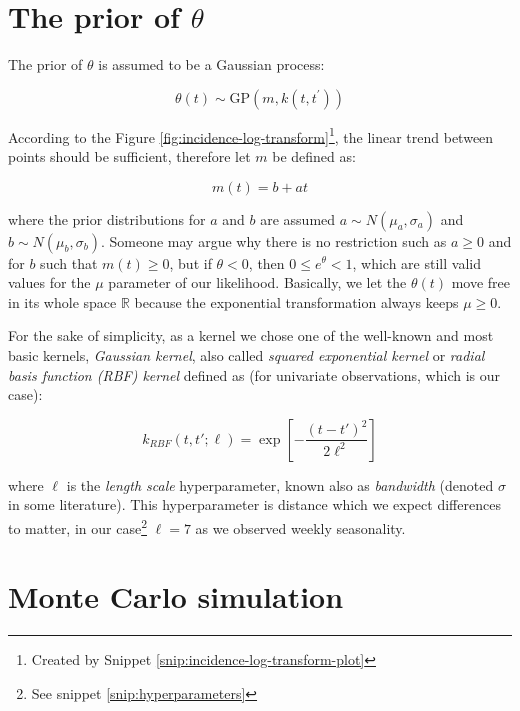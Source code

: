 \documentclass[
  digital, %
  oneside, %
  lof,     %
  lot,     %
]{fithesis4}
\begin{document}
\section{The prior of \texorpdfstring{$\theta$}{Lg}}

The prior of $\theta$ is assumed to be a Gaussian process:

\begin{equation}
  \theta(t) \sim \text{GP}(m, k(t, t^\prime))
\end{equation}

According to the Figure \ref{fig:incidence-log-transform}\footnote{Created by Snippet \ref{snip:incidence-log-transform-plot}}, the linear trend between points should be sufficient, therefore let $m$ be defined as:

\begin{equation}
m(t) = b + a t
\end{equation}

where the prior distributions for $a$ and $b$ are assumed $a \sim N \left( \mu_a, \sigma_a \right)$ and $b \sim N \left( \mu_b, \sigma_b \right)$.
Someone may argue why there is no restriction such as $a \geq 0$ and for $b$ such that $m(t) \geq 0$, but if $\theta < 0$, then $0 \leq e^{\theta} < 1$, which are still valid values for the $\mu$ parameter of our likelihood.
Basically, we let the $\theta(t)$ move free in its whole space $\mathbb{R}$ because the exponential transformation always keeps $\mu \geq 0$.

For the sake of simplicity, as a kernel we chose one of the well-known and most basic kernels, \textit{Gaussian kernel}, also called \textit{squared exponential kernel} or \textit{radial basis function (RBF) kernel} defined as (for univariate observations, which is our case):

\begin{equation}
k_{RBF} \left( t, t'; \ell \right) = \exp \left[ -\frac{(t - t')^2}{2\ell^2} \right]
\end{equation}

where $\ell$ is the \textit{length scale} hyperparameter, known also as \textit{bandwidth} (denoted $\sigma$ in some literature). 
This hyperparameter is distance which we expect differences to matter, in our case\footnote{See snippet \ref{snip:hyperparameters}} $\ell = 7$ as we observed weekly seasonality.


\section{Monte Carlo simulation}
\label{sec:monte-carlo}
\end{document}
